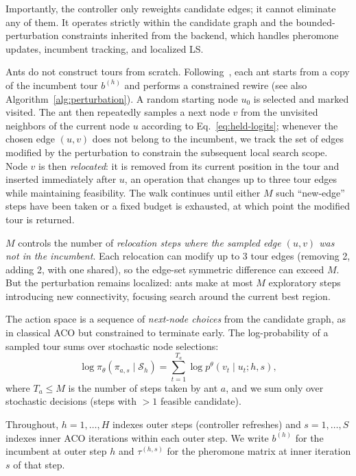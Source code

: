 \documentclass[sigconf,anonymous,review]{acmart}
\theoremstyle{definition}
\theoremstyle{plain}
\begin{document}
Importantly, the controller only reweights candidate edges; it cannot eliminate any of them.
It operates strictly within the candidate graph and the bounded-perturbation constraints inherited from the backend, which handles pheromone updates, incumbent tracking, and localized LS.

Ants do not construct tours from scratch.
Following~\cite{faco}, each ant starts from a copy of the incumbent tour $b^{(h)}$ and performs a constrained rewire (see also Algorithm~\ref{alg:perturbation}).
A random starting node $u_0$ is selected and marked visited.
The ant then repeatedly samples a next node $v$ from the unvisited neighbors of the current node $u$ according to Eq.~\eqref{eq:held-logits}; whenever the chosen edge $(u,v)$ does not belong to the incumbent, we track the set of edges modified by the perturbation to constrain the subsequent local search scope.
Node $v$ is then \emph{relocated}: it is removed from its current position in the tour and inserted immediately after $u$, an operation that changes up to three tour edges while maintaining feasibility.
The walk continues until either $M$ such ``new-edge'' steps have been taken or a fixed budget is exhausted, at which point the modified tour is returned.

$M$ controls the number of \emph{relocation steps where the sampled edge $(u,v)$ was not in the incumbent}.
Each relocation can modify up to 3 tour edges (removing 2, adding 2, with one shared), so the edge-set symmetric difference can exceed $M$.
But the perturbation remains localized: ants make at most $M$ exploratory steps introducing new connectivity, focusing search around the current best region.

The action space is a sequence of \emph{next-node choices} from the candidate graph, as in classical ACO but constrained to terminate early.
The log-probability of a sampled tour sums over stochastic node selections:
\begin{equation}
\log \pi_\theta(\pi_{a,s} \mid \mathcal{S}_h) = \sum_{t=1}^{T_a} \log p^\theta(v_t \mid u_t; h, s),
\label{eq:logp-trajectory}
\end{equation}
where $T_a \le M$ is the number of steps taken by ant $a$, and we sum only over stochastic decisions (steps with $>1$ feasible candidate).

Throughout, $h = 1,\ldots,H$ indexes outer steps (controller refreshes) and $s = 1,\ldots,S$ indexes inner ACO iterations within each outer step.
We write $b^{(h)}$ for the incumbent at outer step $h$ and $\tau^{(h,s)}$ for the pheromone matrix at inner iteration $s$ of that step.
\end{document}
